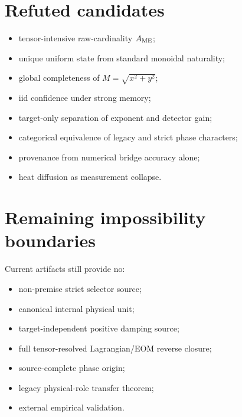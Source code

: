 \documentclass[11pt,a4paper,openany]{report}
\begin{document}
\section{Refuted candidates}

\begin{itemize}
\item 
tensor-intensive raw-cardinality \(A_{\rm ME}\);

\item 
unique uniform state from standard monoidal naturality;

\item 
global completeness of \(M=\sqrt{x^2+y^2}\);

\item 
iid confidence under strong memory;

\item 
target-only separation of exponent and detector gain;

\item 
categorical equivalence of legacy and strict phase characters;

\item 
provenance from numerical bridge accuracy alone;

\item 
heat diffusion as measurement collapse.

\end{itemize}

\section{Remaining impossibility boundaries}

Current artifacts still provide no:

\begin{itemize}
\item 
non-premise strict selector source;

\item 
canonical internal physical unit;

\item 
target-independent positive damping source;

\item 
full tensor-resolved Lagrangian/\allowbreak{}EOM reverse closure;

\item 
source-complete phase origin;

\item 
legacy physical-role transfer theorem;

\item 
external empirical validation.

\end{itemize}
\end{document}
